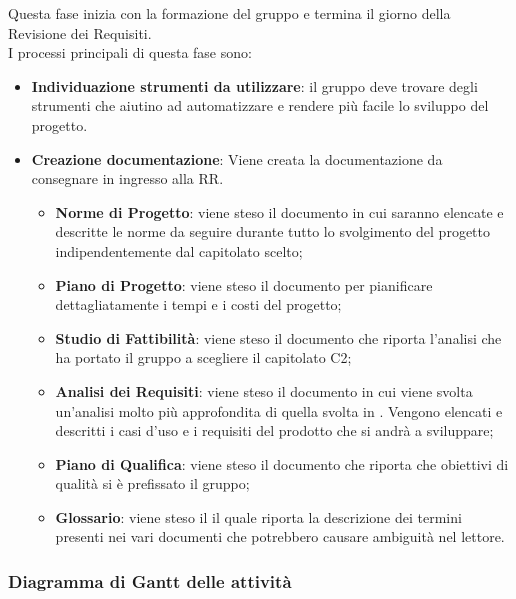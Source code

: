 	Questa fase inizia con la formazione del gruppo e termina il giorno della Revisione dei Requisiti. \\
	I processi principali di questa fase sono: 
	\begin{itemize}
		\item \textbf{Individuazione strumenti da utilizzare}: il gruppo deve trovare degli strumenti che aiutino ad automatizzare e rendere più facile lo sviluppo del progetto.
		\item \textbf{Creazione documentazione}: Viene creata la documentazione da consegnare in ingresso alla RR.
		\att
		\begin{itemize}
			\item \textbf{Norme di Progetto}: viene steso il documento \NPdoc in cui saranno elencate e descritte le norme da seguire durante tutto lo svolgimento del progetto indipendentemente dal capitolato scelto;
			\item \textbf{Piano di Progetto}: viene steso il documento \PPdoc per pianificare dettagliatamente i tempi e i costi del progetto;
			\item \textbf{Studio di Fattibilità}: viene steso il documento \SFdoc che riporta l'analisi che ha portato il gruppo a scegliere il capitolato C2;
			\item \textbf{Analisi dei Requisiti}: viene steso il documento \ARdoc in cui viene svolta un'analisi molto più approfondita di quella svolta in \SFdoc. Vengono elencati e descritti i casi d'uso e i requisiti del prodotto che si andrà a sviluppare;
			\item \textbf{Piano di Qualifica}: viene steso il documento \PQdoc che riporta che obiettivi di qualità si è prefissato il gruppo;
			\item \textbf{Glossario}: viene steso il \Gldoc il quale riporta la descrizione dei termini presenti nei vari documenti che potrebbero causare ambiguità nel lettore.
		\end{itemize}
	\end{itemize}
	
		
		\subsubsection{Diagramma di Gantt delle attività}
		
